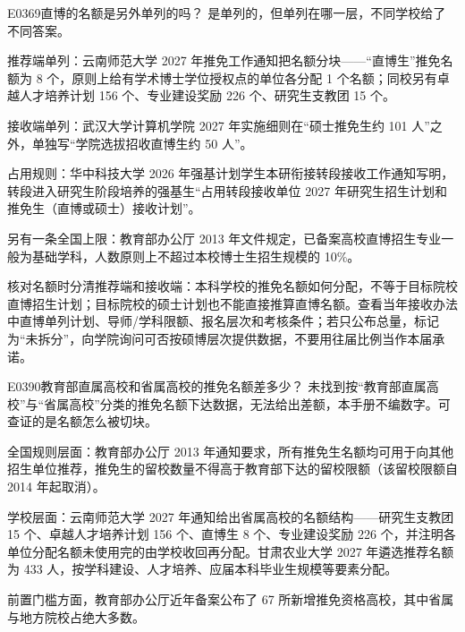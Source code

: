 \begin{qa}{E0369}{直博的名额是另外单列的吗？}
是单列的，但单列在哪一层，不同学校给了不同答案。

推荐端单列：云南师范大学 2027 年推免工作通知把名额分块——“直博生”推免名额为 8 个，原则上给有学术博士学位授权点的单位各分配 1 个名额；同校另有卓越人才培养计划 156 个、专业建设奖励 226 个、研究生支教团 15 个。

接收端单列：武汉大学计算机学院 2027 年实施细则在“硕士推免生约 101 人”之外，单独写“学院选拔招收直博生约 50 人”。

占用规则：华中科技大学 2026 年强基计划学生本研衔接转段接收工作通知写明，转段进入研究生阶段培养的强基生“占用转段接收单位 2027 年研究生招生计划和推免生（直博或硕士）接收计划”。

另有一条全国上限：教育部办公厅 2013 年文件规定，已备案高校直博招生专业一般为基础学科，人数原则上不超过本校博士生招生规模的 10\%。

核对名额时分清推荐端和接收端：本科学校的推免名额如何分配，不等于目标院校直博招生计划；目标院校的硕士计划也不能直接推算直博名额。查看当年接收办法中直博单列计划、导师/学科限额、报名层次和考核条件；若只公布总量，标记为“未拆分”，向学院询问可否按硕博层次提供数据，不要用往届比例当作本届承诺。
\end{qa}

\begin{qa}{E0390}{教育部直属高校和省属高校的推免名额差多少？}
未找到按“教育部直属高校”与“省属高校”分类的推免名额下达数据，无法给出差额，本手册不编数字。可查证的是名额怎么被切块。

全国规则层面：教育部办公厅 2013 年通知要求，所有推免生名额均可用于向其他招生单位推荐，推免生的留校数量不得高于教育部下达的留校限额（该留校限额自 2014 年起取消）。

学校层面：云南师范大学 2027 年通知给出省属高校的名额结构——研究生支教团 15 个、卓越人才培养计划 156 个、直博生 8 个、专业建设奖励 226 个，并注明各单位分配名额未使用完的由学校收回再分配。甘肃农业大学 2027 年遴选推荐名额为 433 人，按学科建设、人才培养、应届本科毕业生规模等要素分配。

前置门槛方面，教育部办公厅近年备案公布了 67 所新增推免资格高校，其中省属与地方院校占绝大多数。
\end{qa}

